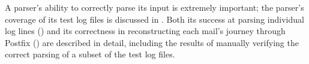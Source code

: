 A parser's ability to correctly parse its input is extremely important; the
parser's coverage of its test log files is discussed in .  Both its success at parsing individual log lines
() and its correctness in reconstructing each
mail's journey through Postfix () are described
in detail, including the results of manually verifying the correct parsing
of a subset of the test log files.

\newpage


